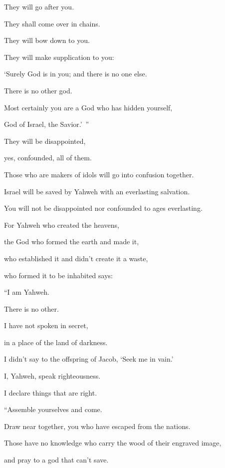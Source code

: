 {\par }{\Q They will go after you.
\par }{\QB They shall come over in chains.
\par }{\QB They will bow down to you.
\par }{\Q They will make supplication to you:
\par }{\QB ‘Surely God is in you; and there is no one else.
\par }{\QB There is no other god.
\par }{\Q {}Most certainly you are a God who has hidden yourself,
\par }{\QB God of Israel, the Savior.’ ”
\par }{\Q {}They will be disappointed,
\par }{\QB yes, confounded, all of them.
\par }{\QB Those who are makers of idols will go into confusion together.
\par }{\Q {}Israel will be saved by Yahweh with an everlasting salvation.
\par }{\QB You will not be disappointed nor confounded to ages everlasting.
\par }{\BB \par }{\Q {}For Yahweh who created the heavens,
\par }{\QB the God who formed the earth and made it,
\par }{\QB who established it and didn’t create it a waste,
\par }{\QB who formed it to be inhabited says:
\par }{\Q “I am Yahweh.
\par }{\QB There is no other.
\par }{\Q {}I have not spoken in secret,
\par }{\QB in a place of the land of darkness.
\par }{\Q I didn’t say to the offspring of Jacob, ‘Seek me in vain.’
\par }{\QB I, Yahweh, speak righteousness.
\par }{\QB I declare things that are right.
\par }{\BB \par }{\Q {}“Assemble yourselves and come.
\par }{\QB Draw near together, you who have escaped from the nations.
\par }{\Q Those have no knowledge who carry the wood of their engraved image,
\par }{\QB and pray to a god that can’t save.
}
